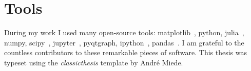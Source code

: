 \section*{Tools}
During my work I used many open-source tools: matplotlib~\cite{Hunter2007}, python, julia~\cite{julia}, numpy, scipy~\cite{scipy}, jupyter~\cite{jupyter}, pyqtgraph, ipython~\cite{ipython}, pandas~\cite{pandas}.
I am grateful to the countless contributors to these remarkable pieces of software. This thesis was typeset using the \emph{classicthesis} template by André Miede.


\endgroup